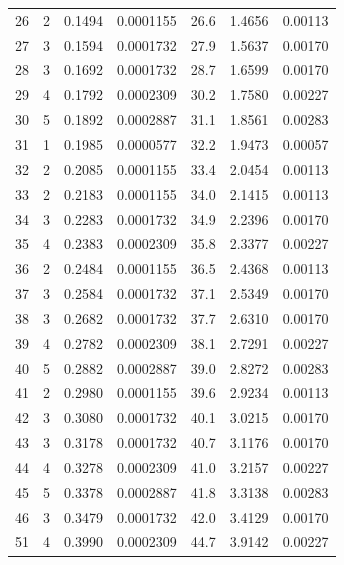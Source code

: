 \documentclass[
  9pt,
]{article}
\begin{document}
\begin{longtable}[]{@{}lrrrrrr@{}}
26 & 2 & 0.1494 & 0.0001155 & 26.6 & 1.4656 & 0.00113 \\
27 & 3 & 0.1594 & 0.0001732 & 27.9 & 1.5637 & 0.00170 \\
28 & 3 & 0.1692 & 0.0001732 & 28.7 & 1.6599 & 0.00170 \\
29 & 4 & 0.1792 & 0.0002309 & 30.2 & 1.7580 & 0.00227 \\
30 & 5 & 0.1892 & 0.0002887 & 31.1 & 1.8561 & 0.00283 \\
31 & 1 & 0.1985 & 0.0000577 & 32.2 & 1.9473 & 0.00057 \\
32 & 2 & 0.2085 & 0.0001155 & 33.4 & 2.0454 & 0.00113 \\
33 & 2 & 0.2183 & 0.0001155 & 34.0 & 2.1415 & 0.00113 \\
34 & 3 & 0.2283 & 0.0001732 & 34.9 & 2.2396 & 0.00170 \\
35 & 4 & 0.2383 & 0.0002309 & 35.8 & 2.3377 & 0.00227 \\
36 & 2 & 0.2484 & 0.0001155 & 36.5 & 2.4368 & 0.00113 \\
37 & 3 & 0.2584 & 0.0001732 & 37.1 & 2.5349 & 0.00170 \\
38 & 3 & 0.2682 & 0.0001732 & 37.7 & 2.6310 & 0.00170 \\
39 & 4 & 0.2782 & 0.0002309 & 38.1 & 2.7291 & 0.00227 \\
40 & 5 & 0.2882 & 0.0002887 & 39.0 & 2.8272 & 0.00283 \\
41 & 2 & 0.2980 & 0.0001155 & 39.6 & 2.9234 & 0.00113 \\
42 & 3 & 0.3080 & 0.0001732 & 40.1 & 3.0215 & 0.00170 \\
43 & 3 & 0.3178 & 0.0001732 & 40.7 & 3.1176 & 0.00170 \\
44 & 4 & 0.3278 & 0.0002309 & 41.0 & 3.2157 & 0.00227 \\
45 & 5 & 0.3378 & 0.0002887 & 41.8 & 3.3138 & 0.00283 \\
46 & 3 & 0.3479 & 0.0001732 & 42.0 & 3.4129 & 0.00170 \\
51 & 4 & 0.3990 & 0.0002309 & 44.7 & 3.9142 & 0.00227 \\
\bottomrule()
\end{longtable}
\end{document}
